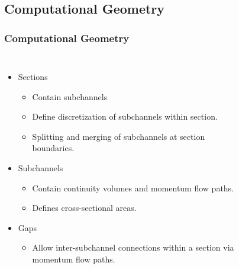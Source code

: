 \documentclass[compress,xcolor=table]{beamer}
\begin{document}
\subsection[Computational Geometry]{Computational Geometry}
\begin{frame}
\frametitle{Computational Geometry}
\begin{columns}

\begin{itemize}
\item{Sections
\begin{itemize}
\item{Contain subchannels}
\item{Define discretization of subchannels within section.}
\item{Splitting and merging of subchannels at section boundaries.}
\end{itemize}
}
\item{Subchannels
\begin{itemize}
\item{Contain continuity volumes and momentum flow paths.}
\item{Defines cross-sectional areas.}
\end{itemize}
}
\item{Gaps
\begin{itemize}
\item{Allow inter-subchannel connections within a section via momentum flow paths.}
\end{itemize}
}
\end{itemize}

\begin{figure}[t]
\centering
\resizebox{!}{0.7\textheight}{

}
\end{figure}	

\end{columns}

\end{frame}
\end{document}
